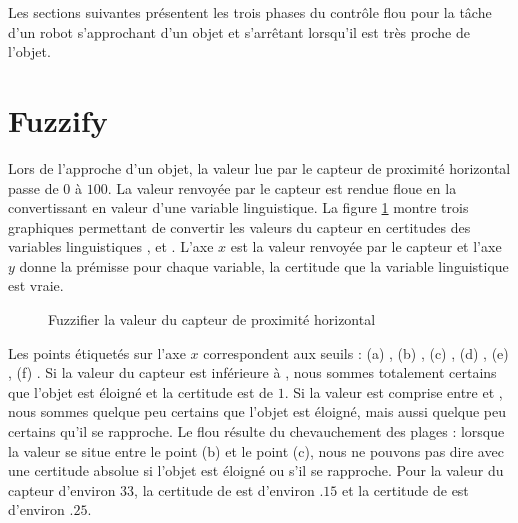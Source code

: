 Les sections suivantes présentent les trois phases du contrôle flou pour la tâche d'un robot s'approchant d'un objet et s'arrêtant lorsqu'il est très proche de l'objet.

\section{Fuzzify}

Lors de l'approche d'un objet, la valeur lue par le capteur de proximité horizontal passe de $0$ à $100$. La valeur renvoyée par le capteur est rendue floue en la convertissant en valeur d'une variable linguistique. La figure \ref{fig.fuzz} montre trois graphiques permettant de convertir les valeurs du capteur en certitudes des variables linguistiques  ,  et . L'axe $x$ est la valeur renvoyée par le capteur et l'axe $y$ donne la prémisse pour chaque variable, la certitude que la variable linguistique est vraie.


\begin{figure}
\begin{center}
\caption{Fuzzifier la valeur du capteur de proximité horizontal}\label{fig.fuzz}
\end{center}
\end{figure}

Les points étiquetés sur l'axe $x$ correspondent aux seuils : (a) , (b) , (c) , (d) , (e) , (f) . Si la valeur du capteur est inférieure à , nous sommes totalement certains que l'objet est éloigné et la certitude est de $1$. Si la valeur est comprise entre  et , nous sommes quelque peu certains que l'objet est éloigné, mais aussi quelque peu certains qu'il se rapproche. Le flou résulte du chevauchement des plages : lorsque la valeur se situe entre le point (b) et le point (c), nous ne pouvons pas dire avec une certitude absolue si l'objet est éloigné ou s'il se rapproche. Pour la valeur du capteur  d'environ $33$, la certitude de  est d'environ $.15$ et la certitude de  est d'environ $.25$.

